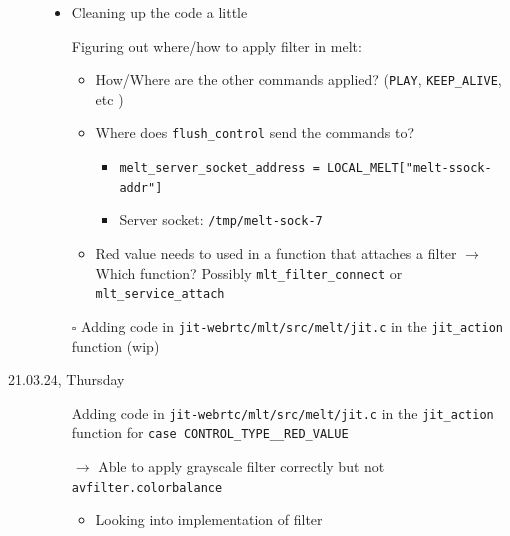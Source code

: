 \documentclass[a4, 11pt]{scrartcl}
\newcommand{\cmark}{\ding{51}}%
\newcommand{\done}{\rlap{$\square$}{\raisebox{2pt}{\large\hspace{1pt}\cmark}}%
	\hspace{-2.5pt}}
\begin{document}
\begin{description}
\begin{itemize}
			\item Cleaning up the code a little
			
			
			\item[\done] Figuring out where/how to apply filter in melt:
			
			\begin{itemize}
				
					
				\item How/Where are the other commands applied? (\texttt{PLAY}, \texttt{KEEP\_ALIVE}, etc )
				
				
				\item Where does \texttt{flush\_control} send the commands to?
				\begin{itemize}
					\item \texttt{melt\_server\_socket\_address = LOCAL\_MELT["melt-ssock-addr"]}
					\item Server socket: \texttt{/tmp/melt-sock-7}
				\end{itemize}
			
				\item Red value needs to used in a function that attaches a filter $\rightarrow$ Which function? Possibly \texttt{mlt\_filter\_connect} or \texttt{mlt\_service\_attach}
				
			\end{itemize}	
		
			\item[$\square$] Adding code in  \texttt{jit-webrtc/mlt/src/melt/jit.c} in the \texttt{jit\_action} function (wip)
		
		

			
	\end{itemize}

	
	
		

\item[21.03.24, Thursday]
\begin{itemize}
	
	\item[]
	
	\item[\done] Adding code in  \texttt{jit-webrtc/mlt/src/melt/jit.c} in the \texttt{jit\_action} function for \texttt{case CONTROL\_TYPE\_\_RED\_VALUE}
	
	\item[$\rightarrow$] Able to apply grayscale filter correctly but not \texttt{avfilter.colorbalance}
	
	\begin{itemize}
		\item Looking into implementation of filter
	\end{itemize}



\end{itemize}
\end{description}
\end{document}
